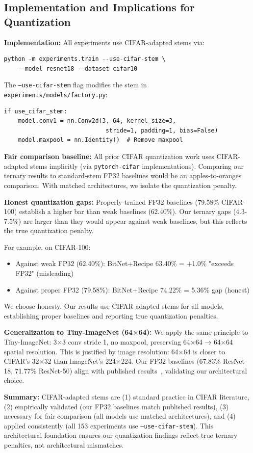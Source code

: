 \subsection{Implementation and Implications for Quantization}

\textbf{Implementation:} All experiments use CIFAR-adapted stems via:
\begin{verbatim}
python -m experiments.train --use-cifar-stem \
    --model resnet18 --dataset cifar10
\end{verbatim}

The \texttt{--use-cifar-stem} flag modifies the stem in \texttt{experiments/models/factory.py}:
\begin{verbatim}
if use_cifar_stem:
    model.conv1 = nn.Conv2d(3, 64, kernel_size=3,
                             stride=1, padding=1, bias=False)
    model.maxpool = nn.Identity()  # Remove maxpool
\end{verbatim}

\textbf{Fair comparison baseline:} All prior CIFAR quantization work uses CIFAR-adapted stems implicitly (via \texttt{pytorch-cifar} implementations). Comparing our ternary results to standard-stem FP32 baselines would be an apples-to-oranges comparison. With matched architectures, we isolate the quantization penalty.

\textbf{Honest quantization gaps:} Properly-trained FP32 baselines (79.58\% CIFAR-100) establish a higher bar than weak baselines (62.40\%). Our ternary gaps (4.3-7.5\%) are larger than they would appear against weak baselines, but this reflects the true quantization penalty.

For example, on CIFAR-100:
\begin{itemize}
    \item Against weak FP32 (62.40\%): BitNet+Recipe 63.40\% = +1.0\% "exceeds FP32" (misleading)
    \item Against proper FP32 (79.58\%): BitNet+Recipe 74.22\% = 5.36\% gap (honest)
\end{itemize}

We choose honesty. Our results use CIFAR-adapted stems for all models, establishing proper baselines and reporting true quantization penalties.

\textbf{Generalization to Tiny-ImageNet (64×64):} We apply the same principle to Tiny-ImageNet: 3×3 conv stride 1, no maxpool, preserving 64×64 → 64×64 spatial resolution. This is justified by image resolution: 64×64 is closer to CIFAR's 32×32 than ImageNet's 224×224. Our FP32 baselines (67.83\% ResNet-18, 71.77\% ResNet-50) align with published results~\cite{tiny_imagenet_benchmark}, validating our architectural choice.

\textbf{Summary:} CIFAR-adapted stems are (1) standard practice in CIFAR literature, (2) empirically validated (our FP32 baselines match published results), (3) necessary for fair comparison (all models use matched architectures), and (4) applied consistently (all 153 experiments use \texttt{--use-cifar-stem}). This architectural foundation ensures our quantization findings reflect true ternary penalties, not architectural mismatches.
